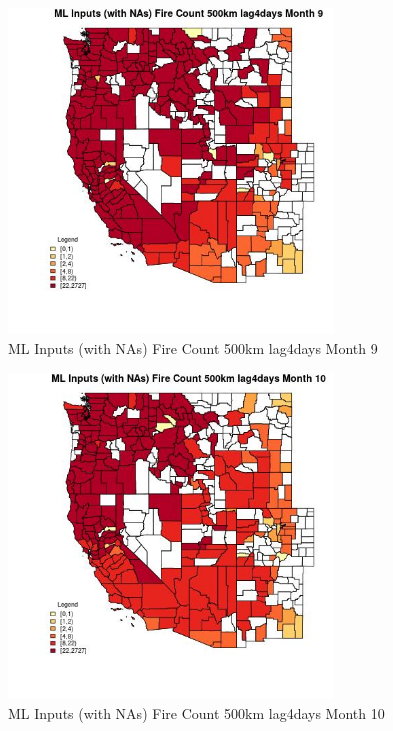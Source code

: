 \begin{figure} 
\centering  
\includegraphics[width=0.77\textwidth]{Code_Outputs/Report_ML_input_PM25_Step4_part_f_de_duplicated_aves_prioritize_24hr_obswNAs_CountyFire_Count_500km_lag4daysmedianMonth9.jpg} 
\caption{\label{fig:Report_ML_input_PM25_Step4_part_f_de_duplicated_aves_prioritize_24hr_obswNAsCountyFire_Count_500km_lag4daysmedianMonth9}ML Inputs (with NAs) Fire Count 500km lag4days Month 9} 
\end{figure} 
 

\begin{figure} 
\centering  
\includegraphics[width=0.77\textwidth]{Code_Outputs/Report_ML_input_PM25_Step4_part_f_de_duplicated_aves_prioritize_24hr_obswNAs_CountyFire_Count_500km_lag4daysmedianMonth10.jpg} 
\caption{\label{fig:Report_ML_input_PM25_Step4_part_f_de_duplicated_aves_prioritize_24hr_obswNAsCountyFire_Count_500km_lag4daysmedianMonth10}ML Inputs (with NAs) Fire Count 500km lag4days Month 10} 
\end{figure} 
 

